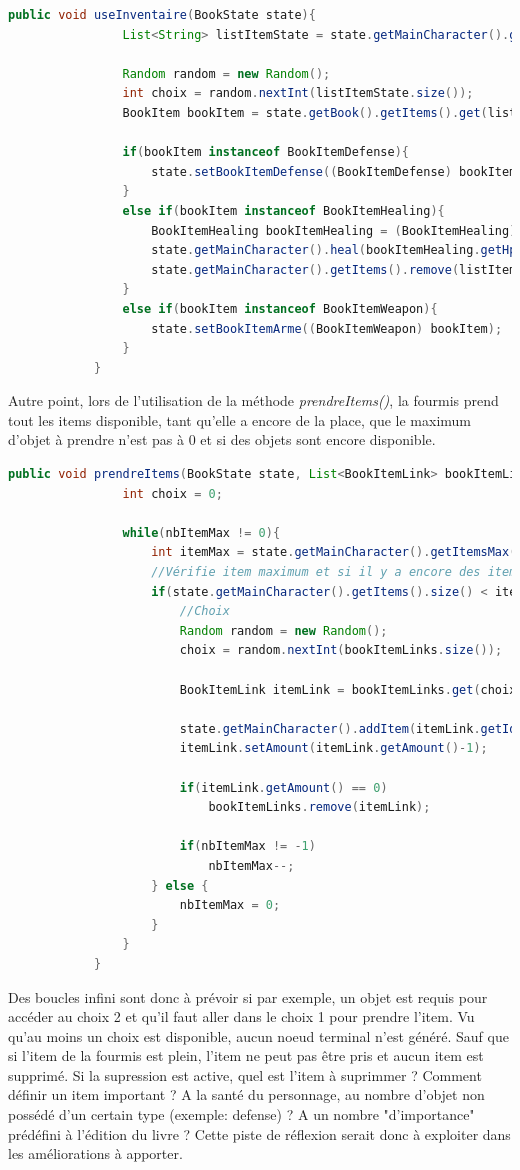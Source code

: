 		\begin{lstlisting}[gobble=12, language=java, caption=useInventaire() de Fourmis]
			public void useInventaire(BookState state){
				List<String> listItemState = state.getMainCharacter().getItems();

				Random random = new Random();
				int choix = random.nextInt(listItemState.size());
				BookItem bookItem = state.getBook().getItems().get(listItemState.get(choix));

				if(bookItem instanceof BookItemDefense){
					state.setBookItemDefense((BookItemDefense) bookItem);
				}
				else if(bookItem instanceof BookItemHealing){
					BookItemHealing bookItemHealing = (BookItemHealing) bookItem;
					state.getMainCharacter().heal(bookItemHealing.getHp());
					state.getMainCharacter().getItems().remove(listItemState.get(choix));
				}
				else if(bookItem instanceof BookItemWeapon){
					state.setBookItemArme((BookItemWeapon) bookItem);
				}
			}
		\end{lstlisting}

		Autre point, lors de l'utilisation de la méthode \textit{prendreItems()}, la fourmis prend tout les items disponible, tant qu'elle a encore de la place, que le maximum d'objet à prendre n'est pas à 0 et si des objets sont encore disponible.

		\begin{lstlisting}[gobble=12, language=java, caption=prendreItems() de Fourmis]
			public void prendreItems(BookState state, List<BookItemLink> bookItemLinks, int nbItemMax){
				int choix = 0;

				while(nbItemMax != 0){
					int itemMax = state.getMainCharacter().getItemsMax();
					//Vérifie item maximum et si il y a encore des items à prendre
					if(state.getMainCharacter().getItems().size() < itemMax && !bookItemLinks.isEmpty()){
						//Choix
						Random random = new Random();
						choix = random.nextInt(bookItemLinks.size());

						BookItemLink itemLink = bookItemLinks.get(choix);

						state.getMainCharacter().addItem(itemLink.getId());
						itemLink.setAmount(itemLink.getAmount()-1);

						if(itemLink.getAmount() == 0)
							bookItemLinks.remove(itemLink);

						if(nbItemMax != -1)
							nbItemMax--;
					} else {
						nbItemMax = 0;
					}
				}
			}
		\end{lstlisting}

		Des boucles infini sont donc à prévoir si par exemple, un objet est requis pour accéder au choix 2 et qu'il faut aller dans le choix 1 pour prendre l'item. Vu qu'au moins un choix est disponible, aucun noeud terminal n'est généré. Sauf que si l'item de la fourmis est plein, l'item ne peut pas être pris et aucun item est supprimé. Si la supression est active, quel est l'item à suprimmer ? Comment définir un item important ? A la santé du personnage, au nombre d'objet non possédé d'un certain type (exemple: defense) ? A un nombre "d'importance" prédéfini à l'édition du livre ? Cette piste de réflexion serait donc à exploiter dans les améliorations à apporter.

